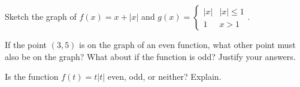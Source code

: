 \documentclass[notes]{subfiles}
\begin{document}
		

		\begin{ex}
			Sketch the graph of $f(x) = x + |x|$ and $g(x) = \begin{cases} |x| & |x| \leq 1\\ 1 & x > 1\end{cases}$.
		\end{ex}
			
		\begin{ex}
			If the point $(3,5)$ is on the graph of an even function, what other point must also be on the graph?  What about if the function is odd?  Justify your answers.
		\end{ex}
			
		\begin{ex}
			Is the function $f(t) = t|t|$ even, odd, or neither?  Explain.
		\end{ex}
		\clearpage
\end{document}
